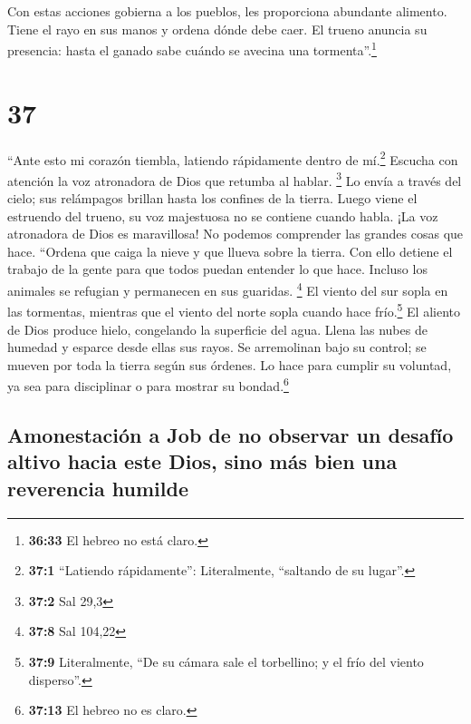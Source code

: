  Con estas acciones gobierna a los pueblos, les
proporciona abundante alimento.  Tiene el rayo en sus
manos y ordena dónde debe caer.  El trueno anuncia su
presencia: hasta el ganado sabe cuándo se avecina una
tormenta''.\footnote{\textbf{36:33} El hebreo no está claro.}

\hypertarget{section-36}{%
\section{37}\label{section-36}}

 ``Ante esto mi corazón tiembla, latiendo rápidamente
dentro de mí.\footnote{\textbf{37:1} ``Latiendo rápidamente'':
  Literalmente, ``saltando de su lugar''.}  Escucha con
atención la voz atronadora de Dios que retumba al hablar. \footnote{\textbf{37:2}
  Sal 29,3}  Lo envía a través del cielo; sus relámpagos
brillan hasta los confines de la tierra.  Luego viene el
estruendo del trueno, su voz majestuosa no se contiene cuando habla.
 ¡La voz atronadora de Dios es maravillosa! No podemos
comprender las grandes cosas que hace.  ``Ordena que caiga
la nieve y que llueva sobre la tierra.  Con ello detiene
el trabajo de la gente para que todos puedan entender lo que hace.
 Incluso los animales se refugian y permanecen en sus
guaridas. \footnote{\textbf{37:8} Sal 104,22}  El viento
del sur sopla en las tormentas, mientras que el viento del norte sopla
cuando hace frío.\footnote{\textbf{37:9} Literalmente, ``De su cámara
  sale el torbellino; y el frío del viento disperso''.} 
El aliento de Dios produce hielo, congelando la superficie del agua.
 Llena las nubes de humedad y esparce desde ellas sus
rayos.  Se arremolinan bajo su control; se mueven por
toda la tierra según sus órdenes.  Lo hace para cumplir
su voluntad, ya sea para disciplinar o para mostrar su
bondad.\footnote{\textbf{37:13} El hebreo no es claro.}

\hypertarget{amonestaciuxf3n-a-job-de-no-observar-un-desafuxedo-altivo-hacia-este-dios-sino-muxe1s-bien-una-reverencia-humilde}{%
\subsection{Amonestación a Job de no observar un desafío altivo hacia
este Dios, sino más bien una reverencia
humilde}\label{amonestaciuxf3n-a-job-de-no-observar-un-desafuxedo-altivo-hacia-este-dios-sino-muxe1s-bien-una-reverencia-humilde}}

